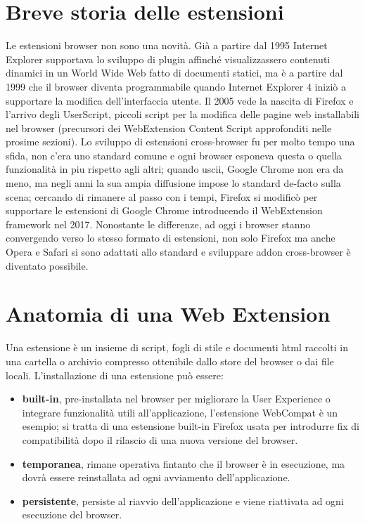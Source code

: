 \documentclass{sapthesis}
\newcommand{\bold}[1]{\textbf{#1}}
\begin{document}
    \section{Breve storia delle estensioni}
    \label{breve_storia_delle_estensioni}
        Le estensioni browser non sono una novità. Già a partire dal 1995 Internet Explorer
        supportava lo sviluppo di plugin \cite{extension-history} affinché visualizzassero contenuti
        dinamici in un World Wide Web fatto di documenti statici, ma è a partire dal 1999 che
        il browser diventa programmabile quando Internet Explorer 4 iniziò a supportare la modifica
        dell'interfaccia utente. Il 2005 vede la nascita di Firefox e l'arrivo degli UserScript,
        piccoli script per la modifica delle pagine web installabili nel browser (precursori dei
        WebExtension Content Script approfonditi nelle prosime sezioni).
        Lo sviluppo di estensioni cross-browser fu per molto tempo una sfida, non c'era uno standard
        comune e ogni browser esponeva questa o quella funzionalità in piu rispetto agli altri; quando
        uscii, Google Chrome non era da meno, ma negli anni la sua ampia diffusione impose lo standard
        de-facto sulla scena; cercando di rimanere al passo con i tempi, Firefox si modificò per
        supportare le estensioni di Google Chrome introducendo il WebExtension framework nel 2017.
        Nonostante le differenze, ad oggi i browser stanno convergendo verso lo stesso formato di estensioni,
        non solo Firefox ma anche Opera e Safari si sono adattati allo standard e sviluppare addon
        cross-browser è diventato possibile.

    \section{Anatomia di una Web Extension }
    \label{sec:anatomia_di_una_web_extension}
        Una estensione è un insieme di script, fogli di stile e documenti html raccolti in una cartella o
        archivio compresso ottenibile dallo store del browser o dai file locali. L'installazione di una
        estensione può essere:
        \begin{itemize}
            \item \bold{built-in}, pre-installata nel browser per migliorare la User Experience
                    o integrare funzionalità utili all'applicazione, l'estensione WebCompat è un esempio;
                    si tratta di una estensione built-in Firefox usata per introdurre fix di compatibilità
                    dopo il rilascio di una nuova versione del browser.

            \item \bold{temporanea}, rimane operativa fintanto che il browser è in esecuzione, ma dovrà essere
                    reinstallata ad ogni avviamento dell'applicazione.

            \item \bold{persistente}, persiste al riavvio dell'applicazione e viene riattivata ad ogni
                    esecuzione del browser.
        \end{itemize}
        
\end{document}
